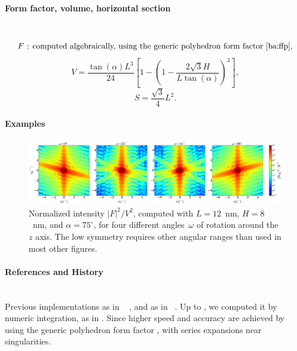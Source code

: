 \paragraph{Form factor, volume, horizontal section}\strut\\
\begin{equation*}
  F\text{~: computed algebraically,
          using the generic polyhedron form factor~\cite{ba:ffp},}
\end{equation*}
\begin{equation*}
  V= \dfrac{\tan(\alpha) L^3}{24} \left[1- \left(1 -
  \dfrac{2\sqrt{3} H}{L \tan(\alpha)} \right)^3\right],
\end{equation*}
\begin{equation*}
  S =\dfrac{\sqrt{3}}{4}L^2.
\end{equation*}

\paragraph{Examples}\strut

\begin{figure}[H]
\begin{center}
\includegraphics[width=\textwidth]{fig/ff2/ff_Tetrahedron.pdf}
\end{center}
\caption{Normalized intensity $|F|^2/V^2$,
computed with $L=12$~nm, $H=8$~nm, and $\alpha=75^\circ$,
for four different angles~$\omega$ of rotation around the $z$ axis.
The low symmetry requires other angular ranges than used in most other figures.}
\end{figure}

\paragraph{References and History}\strut\\
Previous implementations as  in \IsGISAXS\
\cite[Eq.~2.30]{Laz08} \cite[Eq.~220]{ReLL09},
and as   in \FitGISAXS\ \cite{Bab13}.
Up to , we computed it by numeric integration, as in \IsGISAXS.
Since \BornAgain-1.6 higher speed and accuracy are achieved
by using the generic polyhedron form factor \cite{ba:ffp},
with series expansions near singularities.

